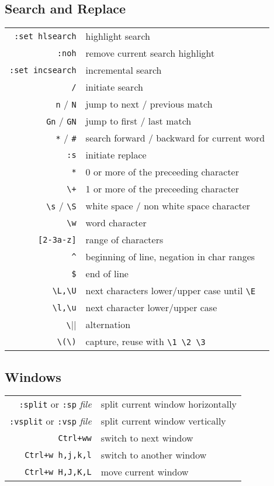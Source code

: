 \begin{multicols*}{3}
\subsection*{Search and Replace}
\begin{tabular}{@{}rl@{}}
\verb|:set hlsearch| & highlight search \\
\verb|:noh|      & remove current search highlight \\
\verb|:set incsearch| & incremental search \\
\verb|/|        & initiate search \\
\verb|n| / \verb|N| & jump to next / previous match \\
\verb|Gn| / \verb|GN| & jump to first / last match \\
\verb|*| / \verb|#| & search forward / backward for current word \\
\verb|:s|       & initiate replace \\
\verb|*|        & 0 or more of the preceeding character \\
\verb|\+|       & 1 or more of the preceeding character \\
\verb|\s| / \verb|\S|      & white space / non white space character \\
\verb|\w|       & word character \\
\verb|[2-3a-z]| & range of characters \\
\verb|^|        & beginning of line, negation in char ranges \\
\verb|$|        & end of line \\
\verb|\L,\U|    & next characters lower/upper case until \verb|\E| \\
\verb|\l,\u|    & next character lower/upper case \\
\verb|\||       & alternation \\
\verb|\(\)|     & capture, reuse with \verb|\1 \2 \3|
\end{tabular}

\subsection*{Windows}
\begin{tabular}{@{}rl@{}}
\verb|:split| or \verb|:sp| \itshape{file} & split current window horizontally \\
\verb|:vsplit| or \verb|:vsp| \itshape{file} & split current window vertically \\
\verb|Ctrl+ww| & switch to next window \\
\verb|Ctrl+w h,j,k,l| & switch to another window \\
\verb|Ctrl+w H,J,K,L| & move current window
\end{tabular}


\end{multicols*}
